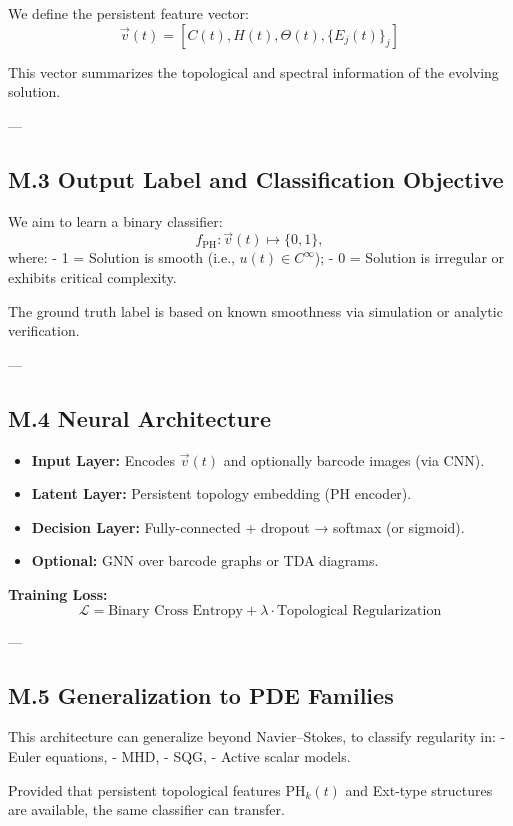 \documentclass[11pt]{article}
\theoremstyle{definition}
\begin{document}
We define the persistent feature vector:
\[
\vec{v}(t) = \left[ C(t), H(t), \Theta(t), \{E_j(t)\}_j \right]
\]

This vector summarizes the topological and spectral information of the evolving solution.

---

\subsection*{M.3 Output Label and Classification Objective}

We aim to learn a binary classifier:
\[
f_{\mathrm{PH}}: \vec{v}(t) \mapsto \{0,1\},
\]
where:
- 1 = Solution is smooth (i.e., \( u(t) \in C^\infty \));
- 0 = Solution is irregular or exhibits critical complexity.

The ground truth label is based on known smoothness via simulation or analytic verification.

---

\subsection*{M.4 Neural Architecture}

\begin{itemize}
  \item \textbf{Input Layer:} Encodes \( \vec{v}(t) \) and optionally barcode images (via CNN).
  \item \textbf{Latent Layer:} Persistent topology embedding (PH encoder).
  \item \textbf{Decision Layer:} Fully-connected + dropout → softmax (or sigmoid).
  \item \textbf{Optional:} GNN over barcode graphs or TDA diagrams.
\end{itemize}

\textbf{Training Loss:}
\[
\mathcal{L} = \text{Binary Cross Entropy} + \lambda \cdot \text{Topological Regularization}
\]

---

\subsection*{M.5 Generalization to PDE Families}

This architecture can generalize beyond Navier–Stokes, to classify regularity in:
- Euler equations,
- MHD,
- SQG,
- Active scalar models.

Provided that persistent topological features \( \mathrm{PH}_k(t) \) and Ext-type structures are available, the same classifier can transfer.
\end{document}
